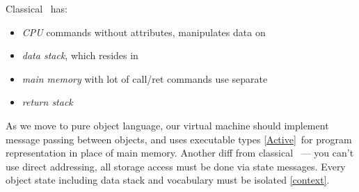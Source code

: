 \label{FVM}\secdown

Classical \F\ has:
\begin{itemize}[nosep]
  \item \emph{CPU} commands without attributes, manipulates data on
  \item \emph{data stack}, which resides in
  \item \emph{main memory} with lot of call/ret commands use separate
  \item \emph{return stack}
\end{itemize}

\noindent
As we move to pure object language, our virtual machine should implement message
passing between objects, and uses executable types \ref{Active}\ for program
representation in place of main memory. Another diff from classical \F\ --- you
can't use direct addressing, all storage access must be done via state messages.
Every object state including data stack and vocabulary must be isolated
\ref{context}.

\secup
